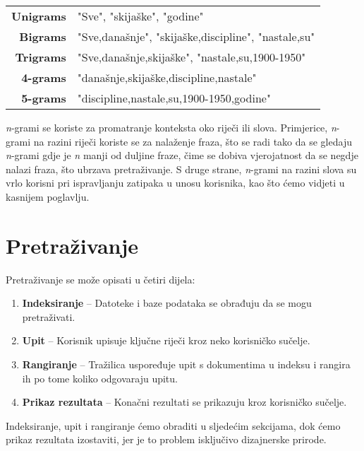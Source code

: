 \documentclass[11pt]{scrreprt}
\begin{document}
\begin{center}
  \begin{tabular}{rl}
    \textbf{Unigrams} & "Sve", "skijaške", "godine"                         \\
    \textbf{Bigrams}  & "Sve,današnje", "skijaške,discipline", "nastale,su" \\
    \textbf{Trigrams} & "Sve,današnje,skijaške", "nastale,su,1900-1950"     \\
    \textbf{4-grams}  & "današnje,skijaške,discipline,nastale"              \\
    \textbf{5-grams}  & "discipline,nastale,su,1900-1950,godine"            \\
  \end{tabular}
\end{center}

\textit{n}-grami se koriste za promatranje konteksta oko riječi ili slova. Primjerice, \textit{n}-grami na razini riječi koriste se za nalaženje fraza, što se radi tako da se gledaju \textit{n}-grami gdje je \textit{n} manji od duljine fraze, čime se dobiva vjerojatnost da se negdje nalazi fraza, što ubrzava pretraživanje. S druge strane, \textit{n}-grami na razini slova su vrlo korisni pri ispravljanju zatipaka u unosu korisnika, kao što ćemo vidjeti u kasnijem poglavlju.

\chapter{Pretraživanje}

Pretraživanje se može opisati u četiri dijela:

\begin{enumerate}
  \item \textbf{Indeksiranje} – Datoteke i baze podataka se obrađuju da se mogu pretraživati.
  \item \textbf{Upit} – Korisnik upisuje ključne riječi kroz neko korisničko sučelje.
  \item \textbf{Rangiranje} – Tražilica uspoređuje upit s dokumentima u indeksu i rangira ih po tome koliko odgovaraju upitu.
  \item \textbf{Prikaz rezultata} – Konačni rezultati se prikazuju kroz korisničko sučelje.
\end{enumerate}

Indeksiranje, upit i rangiranje ćemo obraditi u sljedećim sekcijama, dok ćemo prikaz rezultata izostaviti, jer je to problem isključivo dizajnerske prirode.
\end{document}
